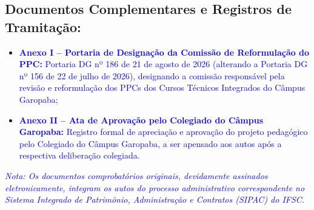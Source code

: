 \documentclass{../../modelos/latex-shared/ifsc-ppc}
\newcommand{\revisao}[1]{\textcolor{blue}{#1}}
\newcommand{\revisao}[1]{#1}
\begin{document}
\subsection{Documentos Complementares e Registros de Tramitação:}

\begin{itemize}
    \item \revisao{\textbf{Anexo I -- Portaria de Designação da Comissão de Reformulação do PPC:} Portaria DG nº 186 de 21 de agosto de 2026 (alterando a Portaria DG nº 156 de 22 de julho de 2026), designando a comissão responsável pela revisão e reformulação dos PPCs dos Cursos Técnicos Integrados do Câmpus Garopaba;}
    \item \revisao{\textbf{Anexo II -- Ata de Aprovação pelo Colegiado do Câmpus Garopaba:} Registro formal de apreciação e aprovação do projeto pedagógico pelo Colegiado do Câmpus Garopaba, a ser apensado aos autos após a respectiva deliberação colegiada.}
\end{itemize}

\vspace{0.5cm}
\noindent\revisao{\small\textit{Nota: Os documentos comprobatórios originais, devidamente assinados eletronicamente, integram os autos do processo administrativo correspondente no Sistema Integrado de Patrimônio, Administração e Contratos (SIPAC) do IFSC.}}
\end{document}

